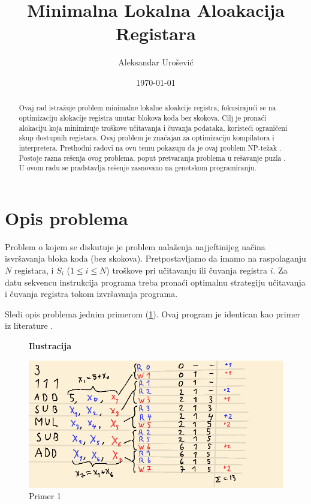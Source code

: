 \documentclass[a4paper, 12pt]{article}
\begin{document}
\title{Minimalna Lokalna Aloakacija Registara}
\author{Aleksandar Urošević}
\date{\today}
\maketitle

\begin{abstract}
Ovaj rad istražuje problem minimalne lokalne aloakcije registra, fokusirajući se na optimizaciju alokacije registra unutar blokova koda bez skokova. Cilj je pronaći alokaciju koja minimizuje troškove učitavanja i čuvanja podataka, koristeći ograničeni skup dostupnih registara. Ovaj problem je značajan za optimizaciju kompilatora i interpretera. Prethodni radovi na ovu temu pokazuju da je ovaj problem NP-težak \cite{OnLocalRegisterAllocation}. Postoje razna rešenja ovog problema, poput pretvaranja problema u rešavanje puzla \cite{RegisterAllocationByPuzzleSolving}. U ovom radu se pradstavlja rešenje zasnovano na genetskom programiranju.
\end{abstract}

\section{Opis problema}
Problem o kojem se diskutuje je problem nalaženja najjeftinijeg načina isvršavanja bloka koda (bez skokova). Pretpostavljamo da imamo na raspolaganju $N$ registara, i $S_i$ ($1 \leq i \leq N$) troškove pri učitavanju ili čuvanja registra $i$. Za datu sekvencu instrukcija programa treba pronaći optimalnu strategiju učitavanja i čuvanja registra tokom izvršavanja programa. 

Sledi opis problema jednim primerom (\ref{primer1}). Ovaj program je identican kao primer iz literature \cite{EvaluationOfAlgorithmsForLocalRegisterAllocation}.

\begin{figure}
\centering
\textbf{Ilustracija}\par\medskip
\includegraphics[scale=0.45]{Image/Illustration1}
\caption{Primer 1}
\label{primer1}
\end{figure}
\end{document}
